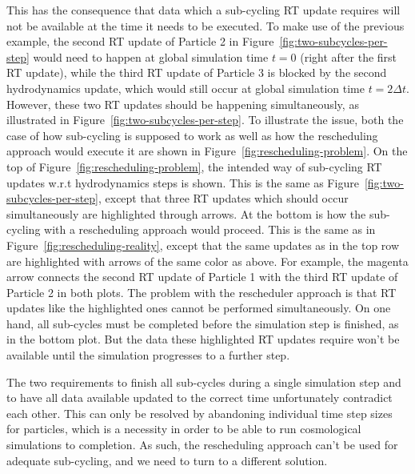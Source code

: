 This has the consequence that data which a sub-cycling RT update requires will not be available at
the time it needs to be executed. To make use of the previous example, the second RT update of
Particle 2 in Figure~\ref{fig:two-subcycles-per-step} would need to happen at global simulation time
$t = 0$ (right after the first RT update), while the third RT update of Particle 3 is blocked by the
second hydrodynamics update, which would still occur at global simulation time $t = 2 \Delta t$.
However, these two RT updates should be happening simultaneously, as illustrated in
Figure~\ref{fig:two-subcycles-per-step}.
%
To illustrate the issue, both the case of how sub-cycling is supposed to work as well as how the
rescheduling approach would execute it are shown in Figure~\ref{fig:rescheduling-problem}. On the
top of Figure~\ref{fig:rescheduling-problem}, the intended way of sub-cycling RT updates w.r.t
hydrodynamics steps is shown. This is the same as Figure~\ref{fig:two-subcycles-per-step}, except
that three RT updates which should occur simultaneously are highlighted through arrows. At the
bottom is how the sub-cycling with a rescheduling approach would proceed. This is the same as in
Figure~\ref{fig:rescheduling-reality}, except that the same updates as in the top row are
highlighted with arrows of the same color as above. For example, the magenta arrow connects the
second RT update of Particle 1 with the third RT update of Particle 2 in both plots. The problem
with the rescheduler approach is that RT updates like the highlighted ones cannot be performed
simultaneously. On one hand, all sub-cycles must be completed before the simulation step is
finished, as in the bottom plot. But the data these highlighted RT updates require won't be
available until the simulation progresses to a further step.

The two requirements to finish all sub-cycles during a single simulation step and to have all data
available updated to the correct time unfortunately contradict each other. This can only be resolved
by abandoning individual time step sizes for particles, which is a necessity in order to be able to
run cosmological simulations to completion. As such, the rescheduling approach can't be used for
adequate sub-cycling, and we need to turn to a different solution.











